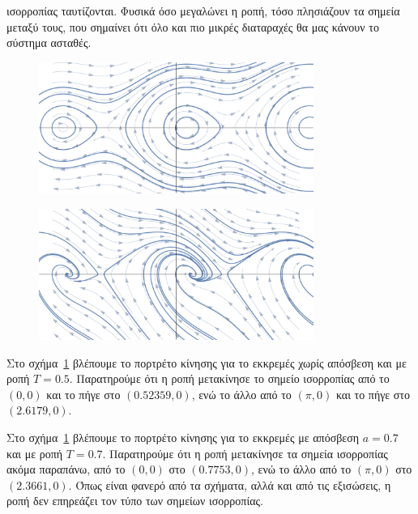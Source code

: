\begin{solution}
    ισορροπίας ταυτίζονται. Φυσικά όσο μεγαλώνει η ροπή, τόσο πλησιάζουν τα
    σημεία μεταξύ τους, που σημαίνει ότι όλο και πιο μικρές διαταραχές θα μας
    κάνουν το σύστημα ασταθές.
    \begin{figure}[h]
        \centering
        \includegraphics[width=0.8\textwidth]{figures/ex4_torque05Comb.pdf}
        \caption{}
        \label{fig:ex4_torque05Comb}
    \end{figure}
    \begin{figure}[h]
        \centering
        \includegraphics[width=0.8\textwidth]{figures/ex4_torque07damped07Comb.pdf}
        \caption{}
        \label{fig:ex4_torque07damped07Comb}
    \end{figure}

    Στο σχήμα~\ref{fig:ex4_torque05Comb} βλέπουμε το πορτρέτο κίνησης για το
    εκκρεμές χωρίς απόσβεση και με ροπή \( T = 0.5 \). Παρατηρούμε ότι η ροπή
    μετακίνησε το σημείο ισορροπίας από το \( (0, 0) \) και το πήγε στο
    \( (0.52359, 0) \), ενώ το άλλο από το \( (\pi, 0) \) και το πήγε στο
    \( (2.6179, 0) \).

    Στο σχήμα~\ref{fig:ex4_torque05Comb} βλέπουμε το πορτρέτο κίνησης για το
    εκκρεμές με απόσβεση \( a = 0.7 \) και με ροπή \( T = 0.7 \). Παρατηρούμε
    ότι η ροπή μετακίνησε τα σημεία ισορροπίας ακόμα παραπάνω,
    από το \( (0, 0) \) στο \( (0.7753, 0) \), ενώ το άλλο από το \( (\pi, 0) \)
    στο \( (2.3661, 0) \). Όπως είναι φανερό από τα σχήματα, αλλά και από τις
    εξισώσεις, η ροπή δεν επηρεάζει τον τύπο των σημείων ισορροπίας.


\end{solution}
